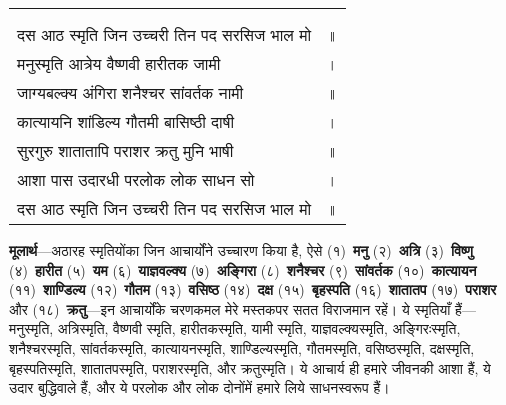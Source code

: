 
{
{\bfseries
\setlength{\mylenone}{0pt}
\settowidth{\mylentwo}{}
\setlength{\mylenone}{\maxof{\mylenone}{\mylentwo}}
\settowidth{\mylentwo}{दस आठ स्मृति जिन उच्चरी तिन पद सरसिज भाल मो}
\setlength{\mylenone}{\maxof{\mylenone}{\mylentwo}}
\settowidth{\mylentwo}{मनुस्मृति आत्रेय वैष्णवी हारीतक जामी}
\setlength{\mylenone}{\maxof{\mylenone}{\mylentwo}}
\settowidth{\mylentwo}{जाग्यबल्क्य अंगिरा शनैश्चर सांवर्तक नामी}
\setlength{\mylenone}{\maxof{\mylenone}{\mylentwo}}
\settowidth{\mylentwo}{कात्यायनि शांडिल्य गौतमी बासिष्ठी दाषी}
\setlength{\mylenone}{\maxof{\mylenone}{\mylentwo}}
\settowidth{\mylentwo}{सुरगुरु शातातापि पराशर क्रतु मुनि भाषी}
\setlength{\mylenone}{\maxof{\mylenone}{\mylentwo}}
\settowidth{\mylentwo}{आशा पास उदारधी परलोक लोक साधन सो}
\setlength{\mylenone}{\maxof{\mylenone}{\mylentwo}}
\settowidth{\mylentwo}{दस आठ स्मृति जिन उच्चरी तिन पद सरसिज भाल मो}
\setlength{\mylenone}{\maxof{\mylenone}{\mylentwo}}
\setlength{\mylentwo}{\baselineskip}
\setlength{\mylenone}{\mylenone + 1pt}
\begin{longtable}[l]{@{\hspace*{\mylen}}>{\setlength\parfillskip{0pt}}p{\mylenone}@{}@{}l@{}}
 & \\[-\the\mylentwo]
\centering{॥ १८ \hspace*{-1.5mm}॥} & \\ \nopagebreak
दस आठ स्मृति जिन उच्चरी तिन पद सरसिज भाल मो & ॥\\
मनुस्मृति आत्रेय वैष्णवी हारीतक जामी & ।\\ \nopagebreak
जाग्यबल्क्य अंगिरा शनैश्चर सांवर्तक नामी & ॥\\
कात्यायनि शांडिल्य गौतमी बासिष्ठी दाषी & ।\\ \nopagebreak
सुरगुरु शातातापि पराशर क्रतु मुनि भाषी & ॥\\
आशा पास उदारधी परलोक लोक साधन सो & ।\\ \nopagebreak
दस आठ स्मृति जिन उच्चरी तिन पद सरसिज भाल मो & ॥
\end{longtable}
}
}
\begin{sloppypar}\justifying{}
\textbf{मूलार्थ}—अठारह स्मृतियोंका जिन आचार्योंने उच्चारण किया है, ऐसे (१)~\textbf{मनु} (२)~\textbf{अत्रि} (३)~\textbf{विष्णु} (४)~\textbf{हारीत} (५)~\textbf{यम} (६)~\textbf{याज्ञवल्क्य} (७)~\textbf{अङ्गिरा} (८)~\textbf{शनैश्चर} (९)~\textbf{सांवर्तक} (१०)~\textbf{कात्यायन} (११)~\textbf{शाण्डिल्य} (१२)~\textbf{गौतम} (१३)~\textbf{वसिष्ठ} (१४)~\textbf{दक्ष} (१५)~\textbf{बृहस्पति} (१६)~\textbf{शातातप} (१७)~\textbf{पराशर} और (१८)~\textbf{क्रतु}—इन आचार्योंके चरण\-कमल मेरे मस्तकपर सतत विराजमान रहें। ये स्मृतियाँ हैं—मनुस्मृति, अत्रिस्मृति, वैष्णवी स्मृति, हारीतकस्मृति, यामी स्मृति, याज्ञवल्क्यस्मृति, अङ्गिरःस्मृति, शनैश्चरस्मृति, सांवर्तकस्मृति, कात्यायनस्मृति, शाण्डिल्यस्मृति, गौतमस्मृति, वसिष्ठस्मृति, दक्षस्मृति, बृहस्पतिस्मृति, शातातपस्मृति, पराशरस्मृति, और क्रतुस्मृति। ये आचार्य ही हमारे जीवनकी आशा हैं, ये उदार बुद्धिवाले हैं, और ये परलोक और लोक दोनोंमें हमारे लिये साधनस्वरूप हैं।
\end{sloppypar}

